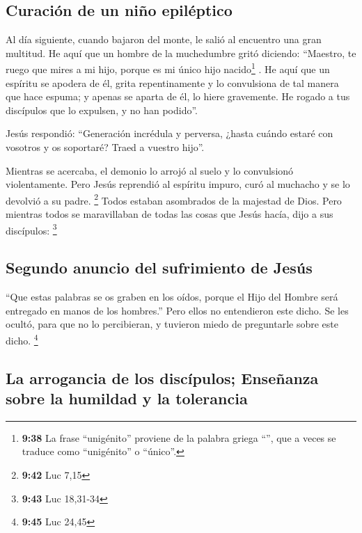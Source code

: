 \begin{paracol}{2}
\hypertarget{curaciuxf3n-de-un-niuxf1o-epiluxe9ptico}{%
\subsection{Curación de un niño
epiléptico}\label{curaciuxf3n-de-un-niuxf1o-epiluxe9ptico}}

 Al día siguiente, cuando bajaron del monte, le salió al
encuentro una gran multitud.  He aquí que un hombre de la
muchedumbre gritó diciendo: ``Maestro, te ruego que mires a mi hijo,
porque es mi único hijo nacido\footnote{\textbf{9:38} La frase
  ``unigénito'' proviene de la palabra griega ``'', que
  a veces se traduce como ``unigénito'' o ``único''.} . 
He aquí que un espíritu se apodera de él, grita repentinamente y lo
convulsiona de tal manera que hace espuma; y apenas se aparta de él, lo
hiere gravemente.  He rogado a tus discípulos que lo
expulsen, y no han podido''.

 Jesús respondió: ``Generación incrédula y perversa,
¿hasta cuándo estaré con vosotros y os soportaré? Traed a vuestro
hijo''.

 Mientras se acercaba, el demonio lo arrojó al suelo y lo
convulsionó violentamente. Pero Jesús reprendió al espíritu impuro, curó
al muchacho y se lo devolvió a su padre. \footnote{\textbf{9:42} Luc
  7,15}  Todos estaban asombrados de la majestad de Dios.
Pero mientras todos se maravillaban de todas las cosas que Jesús hacía,
dijo a sus discípulos: \footnote{\textbf{9:43} Luc 18,31-34}

\hypertarget{segundo-anuncio-del-sufrimiento-de-jesuxfas}{%
\subsection{Segundo anuncio del sufrimiento de
Jesús}\label{segundo-anuncio-del-sufrimiento-de-jesuxfas}}

 ``Que estas palabras se os graben en los oídos, porque
el Hijo del Hombre será entregado en manos de los hombres.''
 Pero ellos no entendieron este dicho. Se les ocultó,
para que no lo percibieran, y tuvieron miedo de preguntarle sobre este
dicho. \footnote{\textbf{9:45} Luc 24,45}

\hypertarget{la-arrogancia-de-los-discuxedpulos-enseuxf1anza-sobre-la-humildad-y-la-tolerancia}{%
\subsection{La arrogancia de los discípulos; Enseñanza sobre la humildad
y la
tolerancia}\label{la-arrogancia-de-los-discuxedpulos-enseuxf1anza-sobre-la-humildad-y-la-tolerancia}}


\end{paracol}
